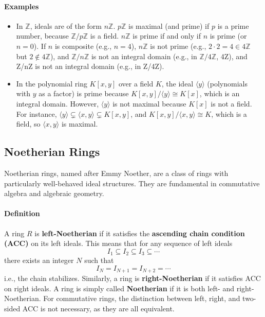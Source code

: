 \documentclass[12pt]{article}
\theoremstyle{definition}
\numberwithin{equation}{subsection}
\begin{document}
\paragraph{Examples}
\begin{itemize}
\item In $\mathbb{Z}$, ideals are of the form $n\mathbb{Z}$. $p\mathbb{Z}$ is maximal (and prime) if $p$ is a prime number, because $\mathbb{Z}/p\mathbb{Z}$ is a field. $n\mathbb{Z}$ is prime if and only if $n$ is prime (or $n=0$). If $n$ is composite (e.g., $n=4$), $n\mathbb{Z}$ is not prime (e.g., $2\cdot 2=4 \in 4\mathbb{Z}$ but $2 \notin 4\mathbb{Z}$), and $\mathbb{Z}/n\mathbb{Z}$ is not an integral domain (e.g., in $\mathbb{Z}/4\mathbb{Z}$,  
4Z), and Z/nZ is not an integral domain (e.g., in Z/4Z).
\item In the polynomial ring $K[x,y]$ over a field $K$, the ideal $\langle y \rangle$ (polynomials with $y$ as a factor) is prime because $K[x,y]/\langle y \rangle \cong K[x]$, which is an integral domain. However, $\langle y \rangle$ is not maximal because $K[x]$ is not a field. For instance, $\langle y \rangle \subsetneq \langle x,y \rangle \subsetneq K[x,y]$, and $K[x,y]/\langle x,y \rangle \cong K$, which is a field, so $\langle x,y \rangle$ is maximal.
\end{itemize}   

\subsection{Noetherian Rings}

Noetherian rings, named after Emmy Noether, are a class of rings with particularly well-behaved ideal structures. They are fundamental in commutative algebra and algebraic geometry.


\paragraph{Definition} 
A ring $R$ is \textbf{left-Noetherian} if it satisfies the \textbf{ascending chain condition (ACC)} on its left ideals. This means that for any sequence of left ideals
\[
I_1 \subseteq I_2 \subseteq I_3 \subseteq \cdots
\]
there exists an integer $N$ such that
\[
I_N = I_{N+1} = I_{N+2} = \cdots
\]
i.e., the chain stabilizes. Similarly, a ring is \textbf{right-Noetherian} if it satisfies ACC on right ideals. A ring is simply called \textbf{Noetherian} if it is both left- and right-Noetherian. For commutative rings, the distinction between left, right, and two-sided ACC is not necessary, as they are all equivalent.
\end{document}
